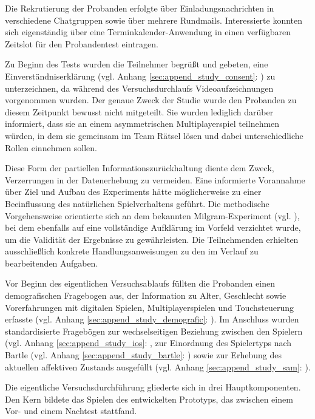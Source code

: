 Die Rekrutierung der Probanden erfolgte über Einladungsnachrichten in verschiedene Chatgruppen sowie über mehrere Rundmails. Interessierte konnten sich eigenständig über eine Terminkalender-Anwendung in einen verfügbaren Zeitslot für den Probandentest eintragen.

Zu Beginn des Tests wurden die Teilnehmer begrüßt und gebeten, eine Einverständniserklärung (vgl. Anhang \ref{sec:append_study_consent}: ) zu unterzeichnen, da während des Versuchsdurchlaufs Videoaufzeichnungen vorgenommen wurden. Der genaue Zweck der Studie wurde den Probanden zu diesem Zeitpunkt bewusst nicht mitgeteilt. Sie wurden lediglich darüber informiert, dass sie an einem asymmetrischen Multiplayerspiel teilnehmen würden, in dem sie gemeinsam im Team Rätsel lösen und dabei unterschiedliche Rollen einnehmen sollen.

Diese Form der partiellen Informationszurückhaltung diente dem Zweck, Verzerrungen in der Datenerhebung zu vermeiden. Eine informierte Vorannahme über Ziel und Aufbau des Experiments hätte möglicherweise zu einer Beeinflussung des natürlichen Spielverhaltens geführt. Die methodische Vorgehensweise orientierte sich an dem bekannten Milgram-Experiment (vgl. \citealp{milgram_behavioral_1963}), bei dem ebenfalls auf eine vollständige Aufklärung im Vorfeld verzichtet wurde, um die Validität der Ergebnisse zu gewährleisten. Die Teilnehmenden erhielten ausschließlich konkrete Handlungsanweisungen zu den im Verlauf zu bearbeitenden Aufgaben.

Vor Beginn des eigentlichen Versuchsablaufs füllten die Probanden einen demografischen Fragebogen aus, der Information zu Alter, Geschlecht sowie Vorerfahrungen mit digitalen Spielen, Multiplayerspielen und Touchsteuerung erfasste (vgl. Anhang \ref{sec:append_study_demografic}: ). Im Anschluss wurden standardisierte Fragebögen zur wechselseitigen Beziehung zwischen den Spielern (vgl. Anhang \ref{sec:append_study_ios}: , zur Einordnung des Spielertyps nach Bartle (vgl. Anhang \ref{sec:append_study_bartle}: ) sowie zur Erhebung des aktuellen affektiven Zustands ausgefüllt (vgl. Anhang \ref{sec:append_study_sam}: ).

Die eigentliche Versuchsdurchführung gliederte sich in drei Hauptkomponenten. Den Kern bildete das Spielen des entwickelten Prototyps, das zwischen einem Vor- und einem Nachtest stattfand.

